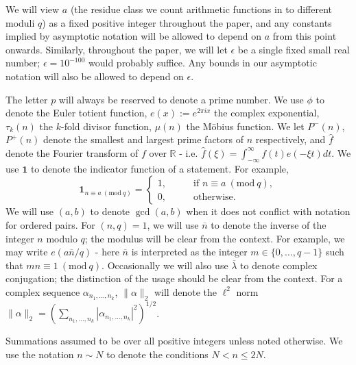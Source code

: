 \documentclass[10pt]{amsart}
\theoremstyle{plain}
\numberwithin{equation}{section}
\newcommand{\Mod}[1]{\ (\mathrm{mod}\ #1)}
\renewcommand{\hat}[1]{\widehat #1}
\begin{document}
We will view $a$ (the residue class we count arithmetic functions in to different moduli $q$) as a fixed positive integer throughout the paper, and any constants implied by asymptotic notation will be allowed to depend on $a$ from this point onwards. Similarly, throughout the paper, we will let $\epsilon$ be a single fixed small real number; $\epsilon=10^{-100}$ would probably suffice. Any bounds in our asymptotic notation will also be allowed to depend on $\epsilon$.

The letter $p$ will always be reserved to denote a prime number. We use $\phi$ to denote the Euler totient function, $e(x):=e^{2\pi i x}$ the complex exponential, $\tau_k(n)$ the $k$-fold divisor function, $\mu(n)$ the M\"obius function. We let $P^-(n)$, $P^+(n)$ denote the smallest and largest prime factors of $n$ respectively, and $\hat{f}$ denote the Fourier transform of $f$ over $\mathbb{R}$ - i.e. $\hat{f}(\xi)=\int_{-\infty}^{\infty}f(t)e(-\xi t)dt$. We use $\mathbf{1}$ to denote the indicator function of a statement. For example,
\[
\mathbf{1}_{n\equiv a\Mod{q}}=\begin{cases}1,\qquad &\text{if }n\equiv a\Mod{q},\\
0,&\text{otherwise}.
\end{cases}
\]
We will use $(a,b)$ to denote $\gcd(a,b)$ when it does not conflict with notation for ordered pairs. For $(n,q)=1$, we will use $\overline{n}$ to denote the inverse of the integer $n$ modulo $q$; the modulus will be clear from the context. For example, we may write $e(a\overline{n}/q)$ - here $\overline{n}$ is interpreted as the integer $m\in \{0,\dots,q-1\}$ such that $m n\equiv 1\Mod{q}$. Occasionally we will also use $\overline{\lambda}$ to denote complex conjugation; the distinction of the usage should be clear from the context.  For a complex sequence $\alpha_{n_1,\dots,n_k}$, $\|\alpha\|_2$ will denote the $\ell^2$ norm $\|\alpha\|_2=(\sum_{n_1,\dots,n_k}|\alpha_{n_1,\dots,n_k}|^2)^{1/2}$.

Summations assumed to be over all positive integers unless noted otherwise. We use the notation $n\sim N$ to denote the conditions $N<n\le 2N$.
\end{document}
